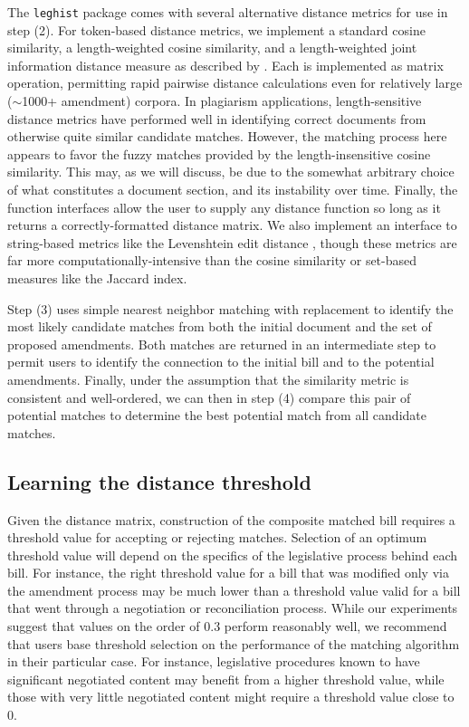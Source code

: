 \documentclass[11pt]{article}
\begin{document}
The \texttt{leghist} package comes with several alternative distance
metrics for use in step (2). For token-based distance metrics, we
implement a standard cosine similarity, a length-weighted cosine
similarity, and a length-weighted joint information distance measure
as described by \cite{hoad2003methods}. Each is implemented as matrix
operation, permitting rapid pairwise distance calculations even for
relatively large ($\sim$1000+ amendment) corpora. In plagiarism
applications, length-sensitive distance metrics have performed well in
identifying correct documents from otherwise quite similar candidate
matches. However, the matching process here appears to favor the fuzzy
matches provided by the length-insensitive cosine similarity. This
may, as we will discuss, be due to the somewhat arbitrary choice of
what constitutes a document section, and its instability over
time. Finally, the function interfaces allow the user to supply any
distance function so long as it returns a correctly-formatted distance
matrix. We also implement an interface to string-based metrics like
the Levenshtein edit distance \citep{elmagarmid2007}, though these
metrics are far more computationally-intensive than the cosine
similarity or set-based measures like the Jaccard index.

Step (3) uses simple nearest neighbor matching with replacement to
identify the most likely candidate matches from both the initial
document and the set of proposed amendments. Both matches are returned
in an intermediate step to permit users to identify the connection to
the initial bill and to the potential amendments. Finally, under the
assumption that the similarity metric is consistent and well-ordered,
we can then in step (4) compare this pair of potential matches to
determine the best potential match from all candidate matches.


\subsection{Learning the distance threshold}
\label{sec:learn-dist-thresh}

Given the distance matrix, construction of the composite matched bill
requires a threshold value for accepting or rejecting
matches. Selection of an optimum threshold value will depend on the
specifics of the legislative process behind each bill. For instance,
the right threshold value for a bill that was modified only via the
amendment process may be much lower than a threshold value valid for a
bill that went through a negotiation or reconciliation process. While
our experiments suggest that values on the order of 0.3 perform
reasonably well, we recommend that users base threshold selection on
the performance of the matching algorithm in their particular
case. For instance, legislative procedures known to have significant
negotiated content may benefit from a higher threshold value, while
those with very little negotiated content might require a threshold
value close to 0.
\end{document}
